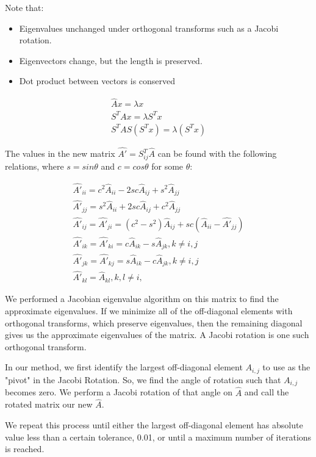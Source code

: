 \documentclass[twocolumn, groupedaddress]{revtex4-1}
\begin{document}
Note that:
\begin{itemize}  
\item Eigenvalues unchanged under orthogonal transforms such as a Jacobi rotation.
\item Eigenvectors change, but the length is preserved.
\item Dot product between vectors is conserved
\end{itemize}

\begin{eqnarray}
\hat{A} x = \lambda x \\
S^T A x = \lambda S^T x \\
S^T A S (S^T x) = \lambda (S^T x)
\end{eqnarray}

The values in the new matrix $\hat{A'}=S_{ij}^T\hat{A}$ can be found with the following relations, where $s=sin\theta$ and $c=cos\theta$ for some $\theta$:

\begin{eqnarray}
\hat{A'}_{ii} = c^2\hat{A}_{ii} - 2sc\hat{A}_{ij} + s^2\hat{A}_{jj} \\
\hat{A'}_{jj} = s^2\hat{A}_{ii} + 2sc\hat{A}_{ij} + c^2\hat{A}_{jj} \\
\hat{A'}_{ij} = \hat{A'}_{ji} = (c^2 - s^2)\hat{A}_{ij} + sc(\hat{A}_{ii} - \hat{A'}_{jj} )  \\
\hat{A'}_{ik} = \hat{A'}_{ki} = c\hat{A}_{ik} - s\hat{A}_{jk}, k\not= i,j \\
\hat{A'}_{jk} = \hat{A'}_{kj} = s\hat{A}_{ik} - c\hat{A}_{jk}, k\not= i,j \\
\hat{A'}_{kl} = \hat{A}_{kl} ,  k,l\not= i, 
\end{eqnarray}



We performed a Jacobian eigenvalue algorithm on this matrix to find the approximate eigenvalues. If we minimize all of the off-diagonal elements with orthogonal transforms, which preserve eigenvalues, then the remaining diagonal gives us the approximate eigenvalues of the matrix. A Jacobi rotation is one such orthogonal transform.

In our method, we first identify the largest off-diagonal element $A_{i,j}$ to use as the "pivot" in the Jacobi Rotation. So, we find the angle of rotation such that $A_{i,j}$ becomes zero. We perform a Jacobi rotation of that angle on $\hat{A}$ and call the rotated matrix our new $\hat{A}$.

 We repeat this process until either the largest off-diagonal element has absolute value less than a certain tolerance, 0.01, or until a maximum number of iterations is reached.
\end{document}
